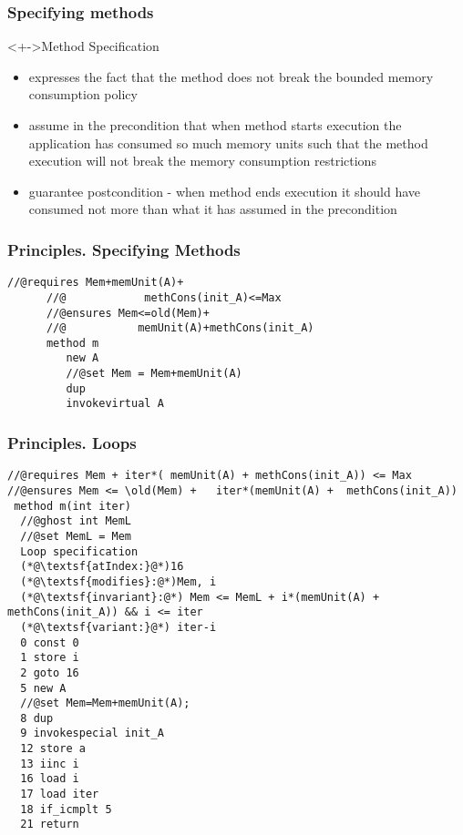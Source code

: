 \documentclass{beamer}
\begin{document}
\begin{frame} \frametitle{Specifying methods}
  \begin{block}<+->{Method Specification}
    \begin{itemize}
      \item  <1->{ expresses the fact that the method does not break the bounded memory consumption policy }
      
      \item  <2->{  assume in the precondition that  when method starts execution the application has consumed so much memory units such that the method execution 
 will not break the memory consumption restrictions}
      \item  <3->{ guarantee postcondition -  when method ends execution it should have consumed not more than what it has assumed in the precondition  }
     \end{itemize}
  \end{block}
\end{frame}

\begin{frame}\frametitle{Principles. Specifying Methods}
  \begin{Example}{
      \begin{lstlisting}[language=jvmis]
      //@requires Mem+memUnit(A)+
      //@            methCons(init_A)<=Max
      //@ensures Mem<=old(Mem)+
      //@           memUnit(A)+methCons(init_A)
      method m
         new A
         //@set Mem = Mem+memUnit(A)
         dup
         invokevirtual A
      \end{lstlisting}         
       }
  \end{Example} 
\end{frame}


\begin{frame}\frametitle{Principles. Loops}
 \begin{Example}{ {\tiny 
 \begin{lstlisting}[language=jvmis]
//@requires Mem + iter*( memUnit(A) + methCons(init_A)) <= Max
//@ensures Mem <= \old(Mem) +   iter*(memUnit(A) +  methCons(init_A))   
 method m(int iter)
  //@ghost int MemL
  //@set MemL = Mem
  Loop specification
  (*@\textsf{atIndex:}@*)16
  (*@\textsf{modifies}:@*)Mem, i
  (*@\textsf{invariant}:@*) Mem <= MemL + i*(memUnit(A) + methCons(init_A)) && i <= iter
  (*@\textsf{variant:}@*) iter-i
  0 const 0
  1 store i
  2 goto 16 
  5 new A
  //@set Mem=Mem+memUnit(A);
  8 dup
  9 invokespecial init_A
  12 store a
  13 iinc i
  16 load i
  17 load iter
  18 if_icmplt 5 
  21 return
 \end{lstlisting}}  
}\end{Example} 
\end{frame}
\end{document}
